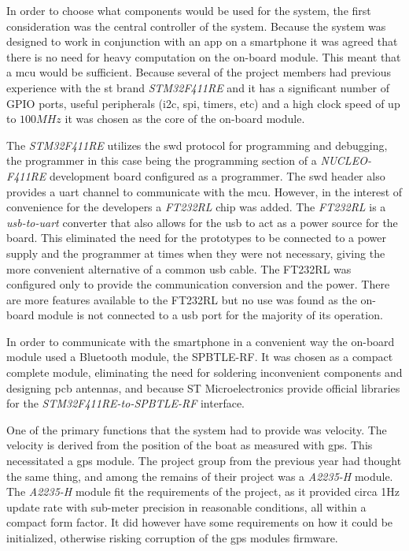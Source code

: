 In order to choose what components would be used for the system, the first consideration was the central controller of the system. Because the system was designed to work in conjunction with an app on a smartphone it was agreed that there is no need for heavy computation on the on-board module. This meant that a \gls{mcu} would be sufficient. Because several of the project members had previous experience with the \gls{st} brand \emph{STM32F411RE} and it has a significant number of GPIO ports, useful peripherals (\gls{i2c}, \gls{spi}, timers, etc) and a high clock speed of up to $100MHz$ it was chosen as the core of the on-board module. 

The \emph{STM32F411RE} utilizes the \gls{swd} protocol for programming and debugging, the programmer in this case being the programming section of a \emph{NUCLEO-F411RE} development board configured as a programmer. The \gls{swd} header also provides a \gls{uart} channel to communicate with the \gls{mcu}. However, in the interest of convenience for the developers a \emph{FT232RL} chip was added. The \emph{FT232RL} is a \emph{\gls{usb}-to-\gls{uart}} converter that also allows for the \gls{usb} to act as a power source for the board. This eliminated the need for the prototypes to be connected to a power supply and the programmer at times when they were not necessary, giving the more convenient alternative of a common \gls{usb} cable.  The FT232RL was configured only to provide the communication conversion and the power. There are more features available to the FT232RL but no use was found as the on-board module is not connected to a \gls{usb} port for the majority of its operation. 

In order to communicate with the smartphone in a convenient way the on-board module used a Bluetooth module, the SPBTLE-RF. It was chosen as a compact complete module, eliminating the need for soldering inconvenient components and designing \gls{pcb} antennas, and because ST Microelectronics provide official libraries for the \emph{STM32F411RE-to-SPBTLE-RF} interface. 

One of the primary functions that the system had to provide was velocity. The velocity is derived from the position of the boat as measured with \gls{gps}. This necessitated a \gls{gps} module. The project group from the previous year had thought the same thing, and among the remains of their project was a \emph{A2235-H} module. The \emph{A2235-H} module fit the requirements of the project, as it provided circa 1Hz update rate with sub-meter precision in reasonable conditions, all within a compact form factor. It did however have some requirements on how it could be initialized, otherwise risking corruption of the \gls{gps} modules firmware. 

